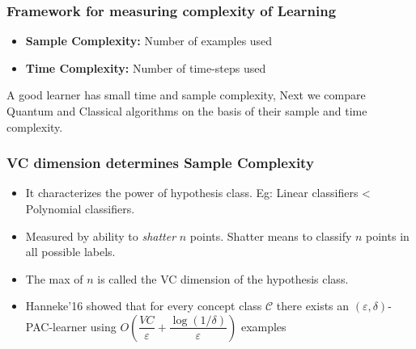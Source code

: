 \documentclass{beamer}
\begin{document}
\begin{frame}\frametitle{Framework for measuring complexity of Learning}
\begin{itemize}
  \item    \textbf{Sample Complexity:} Number of examples used 
  \item    \textbf{Time Complexity:} Number of time-steps used 
\end{itemize} 



A good learner has small time and sample complexity, Next we compare Quantum and
Classical algorithms on the basis of their sample and time complexity.
\end{frame}


\begin{frame}\frametitle{VC dimension determines Sample Complexity}

\begin{itemize}
  \item  It characterizes the power of hypothesis class. Eg: Linear classifiers < Polynomial classifiers.
  \item Measured by ability to \textit{shatter} $n$ points. Shatter means to classify
  $n$ points in all possible labels.
  \item The max of $n$ is called the VC dimension of the hypothesis class.
  \item Hanneke'16 showed that for every concept class $\mathcal{C}$
  there exists an $(\varepsilon, \delta)$-PAC-learner using $O(\dfrac{VC}{\varepsilon} + \dfrac{\log(1/\delta)}{\varepsilon})$ examples
\end{itemize} 

\end{frame}
\end{document}
